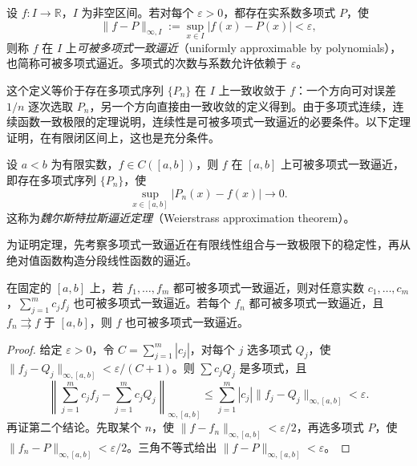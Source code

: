 \begin{definition}
\label{def:uniform-polynomial-approximation}
设 $f:I\to\mathbb R$，$I$ 为非空区间。若对每个 $\varepsilon>0$，都存在实系数多项式 $P$，使
\begin{equation}
    \|f-P\|_{\infty,I}:=\sup_{x\in I}|f(x)-P(x)|<\varepsilon,
    \label{eq:uniform-polynomial-approximation}
\end{equation}
则称 $f$ 在 $I$ 上\emph{可被多项式一致逼近}（uniformly approximable by polynomials），也简称可被多项式逼近。多项式的次数与系数允许依赖于 $\varepsilon$。
\end{definition}

这个定义等价于存在多项式序列 $\{P_n\}$ 在 $I$ 上一致收敛于 $f$：一个方向可对误差 $1/n$ 逐次选取 $P_n$，另一个方向直接由一致收敛的定义得到。由于多项式连续，连续函数一致极限的定理说明，连续性是可被多项式一致逼近的必要条件。以下定理证明，在有限闭区间上，这也是充分条件。

\begin{theorem}[魏尔斯特拉斯逼近定理]
\label{thm:weierstrass-polynomial-approximation}
设 $a<b$ 为有限实数，$f\in C([a,b])$，则 $f$ 在 $[a,b]$ 上可被多项式一致逼近，即存在多项式序列 $\{P_n\}$，使
\[
    \sup_{x\in[a,b]}|P_n(x)-f(x)|\longrightarrow0.
\]
这称为\emph{魏尔斯特拉斯逼近定理}（Weierstrass approximation theorem）。
\end{theorem}

为证明定理，先考察多项式一致逼近在有限线性组合与一致极限下的稳定性，再从绝对值函数构造分段线性函数的逼近。

\begin{lemma}[有限线性组合与一致极限]
\label{lem:polynomial-approximation-closure}
在固定的 $[a,b]$ 上，若 $f_1,\ldots,f_m$ 都可被多项式一致逼近，则对任意实数 $c_1,\ldots,c_m$，$\sum_{j=1}^mc_jf_j$ 也可被多项式一致逼近。若每个 $f_n$ 都可被多项式一致逼近，且 $f_n\rightrightarrows f$ 于 $[a,b]$，则 $f$ 也可被多项式一致逼近。
\end{lemma}

\begin{proof}
给定 $\varepsilon>0$，令 $C=\sum_{j=1}^m|c_j|$，对每个 $j$ 选多项式 $Q_j$，使 $\|f_j-Q_j\|_{\infty,[a,b]}<\varepsilon/(C+1)$。则 $\sum c_jQ_j$ 是多项式，且
\[
    \left\|\sum_{j=1}^mc_jf_j-\sum_{j=1}^mc_jQ_j\right\|_{\infty,[a,b]}
       \leq\sum_{j=1}^m|c_j|\|f_j-Q_j\|_{\infty,[a,b]}
       <\varepsilon.
\]
再证第二个结论。先取某个 $n$，使 $\|f-f_n\|_{\infty,[a,b]}<\varepsilon/2$，再选多项式 $P$，使 $\|f_n-P\|_{\infty,[a,b]}<\varepsilon/2$。三角不等式给出 $\|f-P\|_{\infty,[a,b]}<\varepsilon$。
\end{proof}

